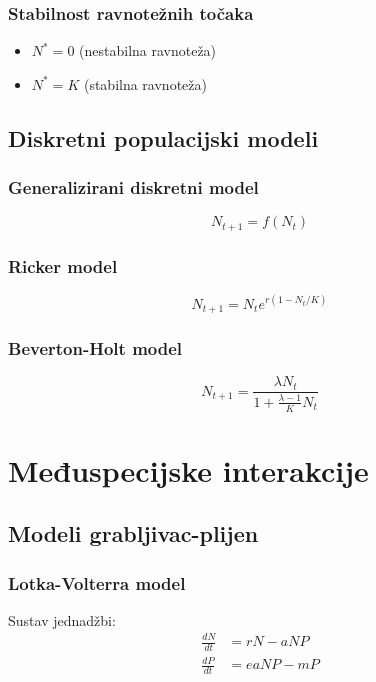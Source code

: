 \documentclass[12pt,a4paper,twoside]{book}
\begin{document}
	\subsection{Stabilnost ravnotežnih točaka}
	\begin{itemize}
		\item $N^* = 0$ (nestabilna ravnoteža)
		\item $N^* = K$ (stabilna ravnoteža)
	\end{itemize}
	
	\section{Diskretni populacijski modeli}
	
	\subsection{Generalizirani diskretni model}
	\begin{equation}
		N_{t+1} = f(N_t)
	\end{equation}
	
	\subsection{Ricker model}
	\begin{equation}
		N_{t+1} = N_t e^{r(1-N_t/K)}
	\end{equation}
	
	\subsection{Beverton-Holt model}
	\begin{equation}
		N_{t+1} = \frac{\lambda N_t}{1 + \frac{\lambda - 1}{K}N_t}
	\end{equation}
	
	\chapter{Međuspecijske interakcije}
	
	\section{Modeli grabljivac-plijen}
	
	\subsection{Lotka-Volterra model}
	Sustav jednadžbi:
	\begin{align}
		\frac{dN}{dt} &= rN - aNP \\
		\frac{dP}{dt} &= eaNP - mP
	\end{align}
	
\end{document}
